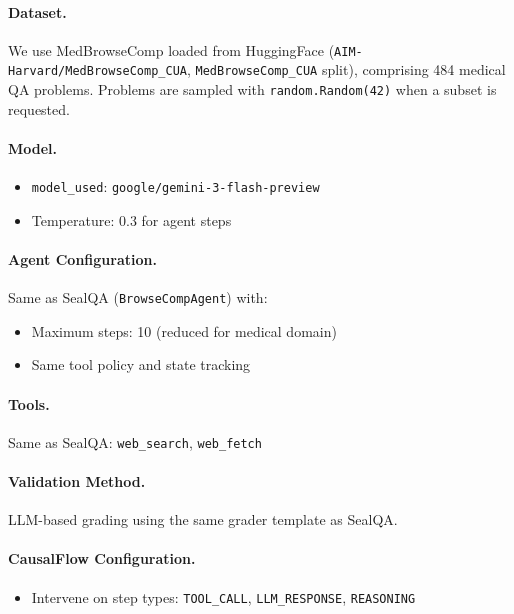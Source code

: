 \documentclass{article}
\theoremstyle{plain}
\theoremstyle{definition}
\theoremstyle{remark}
\begin{document}
\paragraph{Dataset.}
We use MedBrowseComp \cite{chen2025medbrowsecomp} loaded from HuggingFace (\texttt{AIM-Harvard/MedBrowseComp\_CUA}, \texttt{MedBrowseComp\_CUA} split), comprising 484 medical QA problems. Problems are sampled with \texttt{random.Random(42)} when a subset is requested.

\paragraph{Model.}
\begin{itemize}
    \item \texttt{model\_used}: \texttt{google/gemini-3-flash-preview}
    \item Temperature: 0.3 for agent steps
\end{itemize}

\paragraph{Agent Configuration.}
Same as SealQA (\texttt{BrowseCompAgent}) with:
\begin{itemize}
    \item Maximum steps: 10 (reduced for medical domain)
    \item Same tool policy and state tracking
\end{itemize}

\paragraph{Tools.}
Same as SealQA: \texttt{web\_search}, \texttt{web\_fetch}

\paragraph{Validation Method.}
LLM-based grading using the same grader template as SealQA.

\paragraph{CausalFlow Configuration.}
\begin{itemize}
    \item Intervene on step types: \texttt{TOOL\_CALL}, \texttt{LLM\_RESPONSE}, \texttt{REASONING}
\end{itemize}
\end{document}
